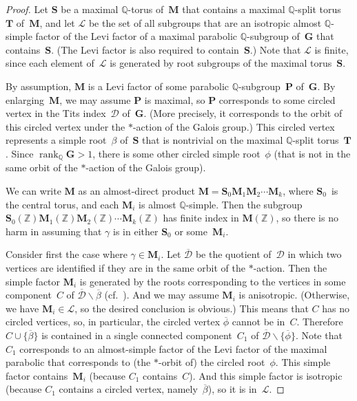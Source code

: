 \documentclass[11pt]{article}
\numberwithin{equation}{section}
\newcommand{\QQ}{\mathbb{Q}}
\newcommand{\ZZ}{\mathbb{Z}}
\newcommand{\Ga}{\mathbf{G}}
\newcommand{\Ma}{\mathbf{M}}
\newcommand{\Pa}{\mathbf{P}}
\newcommand{\Sa}{\mathbf{S}}
\newcommand{\Ta}{\mathbf{T}}
\DeclareMathOperator{\rank}{rank}
\newcommand{\quot}{\overline}
\newcommand{\subgroups}{\mathcal{L}}
\numberwithin{equation}{section}
\theoremstyle{definition}
\begin{document}
\begin{proof}
Let $\Sa$ be a maximal $\QQ$-torus of~$\Ma$ that contains a maximal $\QQ$-split torus~$\Ta$ of~$\Ma$, and let $\subgroups$ be the set of all subgroups that are an isotropic almost $\QQ$-simple factor of the Levi factor of a maximal parabolic $\QQ$-subgroup of~$\Ga$ that contains~$\Sa$. (The Levi factor is also required to contain~$\Sa$.) Note that $\subgroups$ is finite, since each element of~$\subgroups$ is generated by root subgroups of the maximal torus~$\Sa$.

By assumption, $\Ma$ is a Levi factor of some parabolic $\QQ$-subgroup~$\Pa$ of~$\Ga$. By enlarging~$\Ma$, we may assume $\Pa$ is maximal, so $\Pa$ corresponds to some circled vertex in the Tits index~$\mathcal{D}$ of~$\Ga$. (More precisely, it corresponds to the orbit of this circled vertex under the $*$-action of the Galois group.)
This circled vertex represents a simple root~$\beta$ of~$\Sa$ that is nontrivial on the maximal $\QQ$-split torus~$\Ta$. Since $\rank_\QQ \Ga > 1$, there is some other circled simple root~$\phi$ (that is not in the same orbit of the $*$-action of the Galois group).

We can write $\Ma$ as an almost-direct product $\Ma = \Sa_0 \Ma_1 \Ma_2 \cdots \Ma_k$, where $\Sa_0$~is the central torus, and each $\Ma_i$ is almost $\QQ$-simple.
Then the subgroup $\Sa_0(\ZZ) \Ma_1(\ZZ) \Ma_2(\ZZ) \cdots \Ma_k(\ZZ)$ has finite index in $\Ma(\ZZ)$, so there is no harm in assuming that $\gamma$ is in either $\Sa_0$ or some~$\Ma_i$.

Consider first the case where $\gamma \in \Ma_i$.
Let $\quot{\mathcal{D}}$ be the quotient of~$\mathcal{D}$ in which two vertices are identified if they are in the same orbit of the $*$-action. Then the simple factor $\Ma_i$ is generated by the roots corresponding to the vertices in some component~$C$ of $\quot{\mathcal{D}} \smallsetminus \quot{\beta}$ (cf.\ \cite[????~2.5.4, p.~41]{Tits-Classif}).
And we may assume $\Ma_i$ is anisotropic. (Otherwise, we have $\Ma_i \in \subgroups$, so the desired conclusion is obvious.) This means that $C$ has no circled vertices, so, in particular, the circled vertex $\quot{\phi}$ cannot be in~$C$. Therefore $C \cup \{\quot{\beta}\}$ is contained in a single connected component~$C_1$ of $\quot{\mathcal{D}} \smallsetminus \{\quot{\phi}\}$. Note that $C_1$ corresponds to an almost-simple factor of the Levi factor of the maximal parabolic that corresponds to (the $*$-orbit of) the circled root~$\phi$. This simple factor contains~$\Ma_i$ (because $C_1$ contains~$C$). And this simple factor is isotropic (because $C_1$ contains a circled vertex, namely~$\quot{\beta}$), so it is in~$\subgroups$.


\end{proof}
\end{document}
